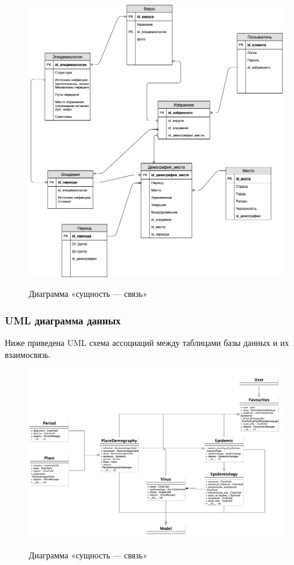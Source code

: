 \documentclass[a4paper,14pt]{extarticle}
\begin{document}
 	\begin{figure}[h!]
 		\begin{center}
 			{\includegraphics[width = \textwidth]{diagram/bd_diagram.png}}
 			\caption{
 				Диаграмма «сущность — связь»}
 			\label{ris:bd}
 		\end{center}
 	\end{figure}
 
 	\newpage
 	
 	\subsubsection{UML диаграмма данных}
 	
 	Ниже приведена UML схема ассоциаций между таблицами базы данных и их взаимосвязь.
 	
 	\begin{figure}[h!]
 		\begin{center}
 			{\includegraphics[width = \textwidth]{diagram/data_uml.png}}
 			\caption{
 				Диаграмма «сущность — связь»}
 			\label{ris:data_uml}
 		\end{center}
 	\end{figure}
 
\end{document}
